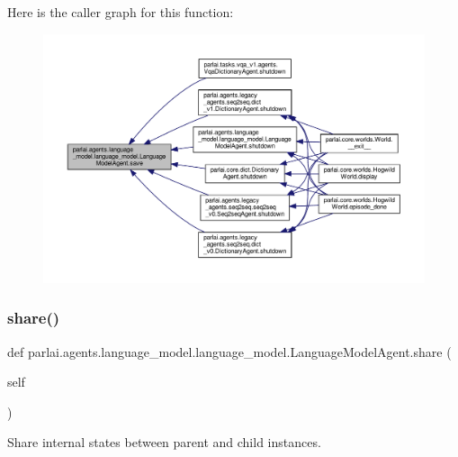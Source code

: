 Here is the caller graph for this function\+:
\nopagebreak
\begin{figure}[H]
\begin{center}
\leavevmode
\includegraphics[width=350pt]{classparlai_1_1agents_1_1language__model_1_1language__model_1_1LanguageModelAgent_adc621ff0e625e2f00225d78408e9bafc_icgraph}
\end{center}
\end{figure}
\mbox{\label{classparlai_1_1agents_1_1language__model_1_1language__model_1_1LanguageModelAgent_a9d871fa6c5da46d2fd5564b814001a97}} 
\subsubsection{\texorpdfstring{share()}{share()}}
{\footnotesize\ttfamily def parlai.\+agents.\+language\+\_\+model.\+language\+\_\+model.\+Language\+Model\+Agent.\+share (\begin{DoxyParamCaption}\item[{}]{self }\end{DoxyParamCaption})}

\begin{DoxyVerb}Share internal states between parent and child instances.\end{DoxyVerb}
 

